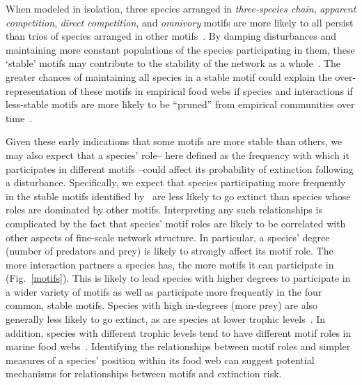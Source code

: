 \documentclass[12pt]{article}
\begin{document}
\begin{spacing}{2.0}
	When modeled in isolation, three species arranged in \emph{three-species chain}, \emph{apparent competition}, \emph{direct competition}, and \emph{omnivory} motifs are more likely to all persist than trios of species arranged in other motifs~\citep{Borrelli2015a}.
	By damping disturbances and maintaining more constant populations of the species participating in them, these `stable' motifs may contribute to the stability of the network as a whole~\citep{Borrelli2015a}. 
    The greater chances of maintaining all species in a stable motif could explain the over-representation of these motifs in empirical food webs if species and interactions if less-stable motifs are more likely to be ``pruned'' from empirical communities over time~\citep{Borrelli2015}. 


	Given these early indications that some motifs are more stable than others, we may also expect that a species' role-- here defined as the frequency with which it participates in different motifs --could affect its probability of extinction following a disturbance.
	Specifically, we expect that species participating more frequently in the stable motifs identified by~\citet{Borrelli2015a} are less likely to go extinct than species whose roles are dominated by other motifs.
	Interpreting any such relationships is complicated by the fact that species' motif roles are likely to be correlated with other aspects of fine-scale network structure. 
    In particular, a species' degree (number of predators and prey) is likely to strongly affect its motif role.
    The more interaction partners a species has, the more motifs it can participate in (Fig.~\ref{motifs}).
    This is likely to lead species with higher degrees to participate in a wider variety of motifs as well as participate more frequently in the four common, stable motifs.
    Species with high in-degrees (more prey) are also generally less likely to go extinct, as are species at lower trophic levels~\citep{Cirtwill2018FoodWebs}.
    In addition, species with different trophic levels tend to have different motif roles in marine food webs~\citep{Cirtwill2018EcolLett}.
    Identifying the relationships between motif roles and simpler measures of a species' position within its food web can suggest potential mechanisms for relationships between motifs and extinction risk.


\end{spacing}
\end{document}
